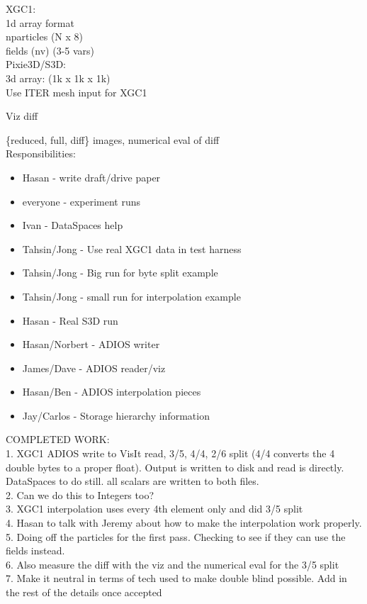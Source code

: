 \documentclass{sig-alt-gov2}
\begin{document}
XGC1:\\
1d array format\\
nparticles (N x 8)\\
fields (nv) (3-5 vars)\\

Pixie3D/S3D:\\
3d array: (1k x 1k x 1k)\\

Use ITER mesh input for XGC1

Viz diff

\{reduced, full, diff\} images, numerical eval of diff\\

Responsibilities:
\begin{itemize}
\item Hasan - write draft/drive paper
\item everyone - experiment runs
\item Ivan - DataSpaces help
\item Tahsin/Jong - Use real XGC1 data in test harness
\item Tahsin/Jong - Big run for byte split example
\item Tahsin/Jong - small run for interpolation example
\item Hasan - Real S3D run
\item Hasan/Norbert - ADIOS writer
\item James/Dave - ADIOS reader/viz
\item Hasan/Ben - ADIOS interpolation pieces
\item Jay/Carlos - Storage hierarchy information
\end{itemize}

COMPLETED WORK:\\
1. XGC1 ADIOS write to VisIt read, 3/5, 4/4, 2/6 split (4/4 converts the 4 double bytes to a proper float). Output is written to disk and read is directly. DataSpaces to do still. all scalars are written to both files.\\
2. Can we do this to Integers too?\\
3. XGC1 interpolation uses every 4th element only and did 3/5 split\\
4. Hasan to talk with Jeremy about how to make the interpolation work properly.
5. Doing off the particles for the first pass. Checking to see if they can use the fields instead.\\
6. Also measure the diff with the viz and the numerical eval for the 3/5 split\\
7. Make it neutral in terms of tech used to make double blind possible. Add in
the rest of the details once accepted\\
\end{document}
